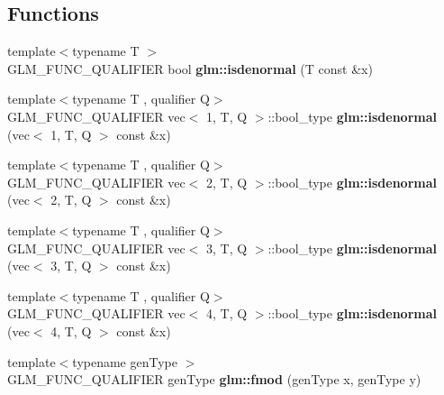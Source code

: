 \subsection*{Functions}
\begin{DoxyCompactItemize}
\item 
\mbox{\label{common_8inl_ae1eb587972c0a1c492f6c7026e34ca4f}} 
{\footnotesize template$<$typename T $>$ }\\G\+L\+M\+\_\+\+F\+U\+N\+C\+\_\+\+Q\+U\+A\+L\+I\+F\+I\+ER bool {\bfseries glm\+::isdenormal} (T const \&x)
\item 
\mbox{\label{common_8inl_a14e320da0485ce7d23a45748fae57144}} 
{\footnotesize template$<$typename T , qualifier Q$>$ }\\G\+L\+M\+\_\+\+F\+U\+N\+C\+\_\+\+Q\+U\+A\+L\+I\+F\+I\+ER vec$<$ 1, T, Q $>$\+::bool\+\_\+type {\bfseries glm\+::isdenormal} (vec$<$ 1, T, Q $>$ const \&x)
\item 
\mbox{\label{common_8inl_af15f64cdc779db01e37f0697c5ba3816}} 
{\footnotesize template$<$typename T , qualifier Q$>$ }\\G\+L\+M\+\_\+\+F\+U\+N\+C\+\_\+\+Q\+U\+A\+L\+I\+F\+I\+ER vec$<$ 2, T, Q $>$\+::bool\+\_\+type {\bfseries glm\+::isdenormal} (vec$<$ 2, T, Q $>$ const \&x)
\item 
\mbox{\label{common_8inl_ae915599e1e261353da94c10571ab2113}} 
{\footnotesize template$<$typename T , qualifier Q$>$ }\\G\+L\+M\+\_\+\+F\+U\+N\+C\+\_\+\+Q\+U\+A\+L\+I\+F\+I\+ER vec$<$ 3, T, Q $>$\+::bool\+\_\+type {\bfseries glm\+::isdenormal} (vec$<$ 3, T, Q $>$ const \&x)
\item 
\mbox{\label{common_8inl_a5e520af4ed807f0b10cef96c7809e8d7}} 
{\footnotesize template$<$typename T , qualifier Q$>$ }\\G\+L\+M\+\_\+\+F\+U\+N\+C\+\_\+\+Q\+U\+A\+L\+I\+F\+I\+ER vec$<$ 4, T, Q $>$\+::bool\+\_\+type {\bfseries glm\+::isdenormal} (vec$<$ 4, T, Q $>$ const \&x)
\item 
\mbox{\label{common_8inl_a823bda2877e4dcc4440987f94e0e3690}} 
{\footnotesize template$<$typename gen\+Type $>$ }\\G\+L\+M\+\_\+\+F\+U\+N\+C\+\_\+\+Q\+U\+A\+L\+I\+F\+I\+ER gen\+Type {\bfseries glm\+::fmod} (gen\+Type x, gen\+Type y)

\end{DoxyCompactItemize}
